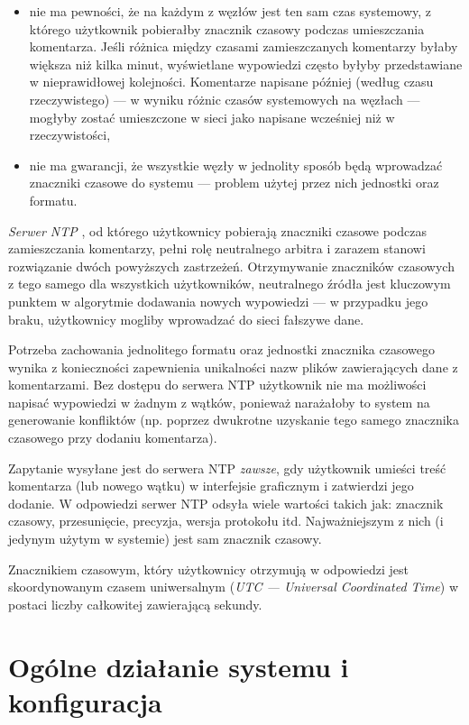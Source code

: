 \documentclass[polish,a4paper,twoside]{ppfcmthesis}
\begin{document}
\begin{itemize}[noitemsep]
  \item nie ma pewności, że na każdym z węzłów jest ten sam czas systemowy, z którego użytkownik pobierałby znacznik czasowy podczas umieszczania komentarza. Jeśli różnica między czasami zamieszczanych komentarzy byłaby większa niż kilka minut, wyświetlane wypowiedzi często byłyby przedstawiane w nieprawidłowej kolejności. Komentarze napisane później (według czasu rzeczywistego) --- w wyniku różnic czasów systemowych na węzłach --- mogłyby zostać umieszczone w sieci jako napisane wcześniej niż w rzeczywistości,
  
  \item nie ma gwarancji, że wszystkie węzły w jednolity sposób będą wprowadzać znaczniki czasowe do systemu --- problem użytej przez nich jednostki oraz formatu.
\end{itemize}

\emph{Serwer NTP} \cite{ntp}, od którego użytkownicy pobierają znaczniki czasowe podczas zamieszczania komentarzy, pełni rolę neutralnego arbitra i zarazem stanowi rozwiązanie dwóch powyższych zastrzeżeń. Otrzymywanie znaczników czasowych z tego samego dla wszystkich użytkowników, neutralnego źródła jest kluczowym punktem w algorytmie dodawania nowych wypowiedzi --- w przypadku jego braku, użytkownicy mogliby wprowadzać do sieci fałszywe dane.

Potrzeba zachowania jednolitego formatu oraz jednostki znacznika czasowego wynika z konieczności zapewnienia unikalności nazw plików zawierających dane z komentarzami. Bez dostępu do serwera NTP użytkownik nie ma możliwości napisać wypowiedzi w żadnym z wątków, ponieważ narażałoby to system na generowanie konfliktów (np. poprzez dwukrotne uzyskanie tego samego znacznika czasowego przy dodaniu komentarza).

Zapytanie wysyłane jest do serwera NTP \emph{zawsze}, gdy użytkownik umieści treść komentarza (lub nowego wątku) w interfejsie graficznym i zatwierdzi jego dodanie. W odpowiedzi serwer NTP odsyła wiele wartości takich jak: znacznik czasowy, przesunięcie, precyzja, wersja protokołu itd. Najważniejszym z nich (i jedynym użytym w systemie) jest sam znacznik czasowy.

Znacznikiem czasowym, który użytkownicy otrzymują w odpowiedzi jest skoordynowanym czasem uniwersalnym (\emph{UTC --- Universal Coordinated Time}) w postaci liczby całkowitej zawierającą sekundy.

\chapter{Ogólne działanie systemu i konfiguracja}
\end{document}
